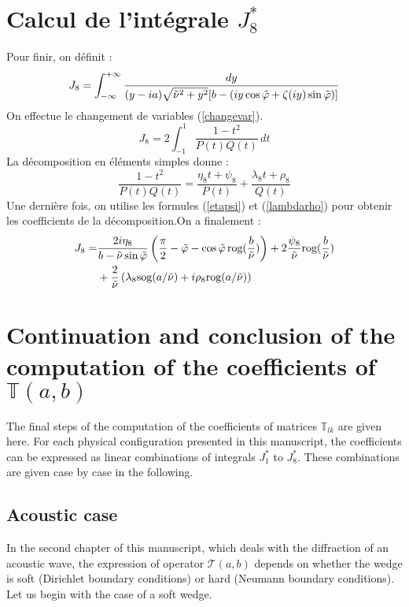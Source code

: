 \section{Calcul de l'intégrale $J_8^*$ }
\label{calculJ8}
Pour finir, on définit :
\begin{equation}
J_8=\int_{-\infty}^{+\infty}\frac{dy}{(y-ia)\sqrt{\tilde{\nu}^2+y^2}\lbrack b-( iy\cos \tilde{\varphi}+ \zeta(iy)\sin \tilde{\varphi}) \rbrack}
\label{defJ8}
\end{equation}
On effectue le changement de variables (\ref{changevar}).
$$J_8=2 \int_{-1}^{1} \frac{1-t^2}{P(t)Q(t)}\,dt$$
La décomposition en éléments simples donne :
$$\frac{1-t^2}{P(t)Q(t)}=\frac{\eta_8 t+\psi_8}{P(t)}+\frac{\lambda_8 t +\rho_8}{Q(t)}$$
Une dernière fois, on utilise les formules (\ref{etapsi}) et (\ref{lambdarho}) pour obtenir les coefficients de la décomposition.On a finalement :
\begin{equation}
\begin{split}
J_8=&\frac{2i\eta_8 }{b-\tilde{\nu}\sin\tilde{\varphi}}\left(\frac{\pi}{2}-\tilde{\varphi}-\cos\tilde{\varphi} \,\mbox{rog}(\frac{b}{\tilde{\nu}}) \right)+2 \frac{\psi_8}{\tilde{\nu}} \mbox{rog}(\frac{b}{\tilde{\nu}} )\\
&+\frac{2}{\tilde{\nu}} \left(\lambda_8 \mbox{sog}(a/\tilde{\nu})+i\rho_8 \mbox{rog}(a/\tilde{\nu}) \right)
\end{split}
\label{valJ8}
\end{equation}

\section{Continuation and conclusion of the computation of the coefficients of $\mathbb{T}(a,b)$}
\label{fincalculs}
The final steps of the computation of the coefficients of matrices $\mathbb{T}_{lk}$ are given here. For each physical configuration presented in this manuscript, the coefficients can be expressed as linear combinations of integrals $J_1^*$ to $J_8^*$. These combinations are given case by case in the following.

\subsection{Acoustic case}
\label{finalTac}
In the second chapter of this manuscript, which deals with the diffraction of an acoustic wave, the expression of operator $\mathcal{T}(a,b)$ depends on whether the wedge is soft (Dirichlet boundary conditions) or hard (Neumann boundary conditions). Let us begin with the case of a soft wedge.  
